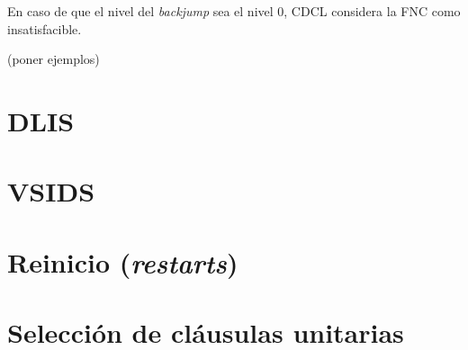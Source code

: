 En caso de que el nivel del \textit{backjump} sea el nivel 0, CDCL considera la FNC como insatisfacible.

(poner ejemplos)


\section{DLIS}

\section{VSIDS}

\section{Reinicio (\textit{restarts})}

\section{Selección de cláusulas unitarias}